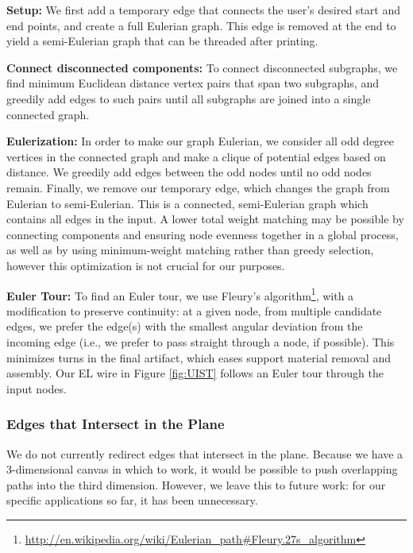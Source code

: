 {\bf Setup:} We first add a temporary edge that connects the user's desired start and end points, and create a full Eulerian graph.  This edge is removed at the end to yield a semi-Eulerian graph that can be threaded after printing.

{\bf Connect disconnected components:} To connect disconnected subgraphs, we find minimum Euclidean distance vertex pairs that span two subgraphs, and greedily add edges to such pairs until all subgraphs are joined into a single connected graph.

{\bf Eulerization:} In order to make our graph Eulerian, we consider all odd degree vertices in the connected graph and make a clique of potential edges based on distance.  We greedily add edges between the odd nodes until no odd nodes remain.  Finally, we remove our temporary edge, which changes the graph from Eulerian to semi-Eulerian.  This is a connected, semi-Eulerian graph which contains all edges in the input.
A lower total weight matching may be possible by connecting components and ensuring node evenness together in a global process, as well as by using minimum-weight matching rather than greedy selection, however this optimization is not crucial for our purposes.

{\bf Euler Tour:} To find an Euler tour, we use Fleury's algorithm\footnote{\url{http://en.wikipedia.org/wiki/Eulerian_path\#Fleury.27s_algorithm}}, with a modification to preserve continuity: at a given node, from multiple candidate edges, we prefer the edge(s) with the smallest angular deviation from the incoming edge (i.e., we prefer to pass straight through a node, if possible).  This minimizes turns in the final artifact, which eases support material removal and assembly.  Our EL wire in Figure \ref{fig:UIST} follows an Euler tour through the input nodes.

\subsubsection{Edges that Intersect in the Plane}
We do not currently redirect edges that intersect in the plane.  Because we have a 3-dimensional canvas in which to work, it would be possible to push overlapping paths into the third dimension.  However, we leave this to future work: for our specific applications so far, it has been unnecessary.

